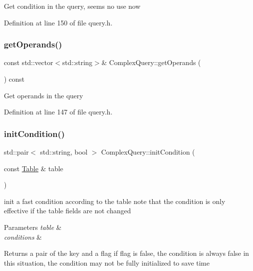 Get condition in the query, seems no use now 

Definition at line 150 of file query.\+h.

\mbox{\label{class_complex_query_a8b01ad18d858402ac96ab83e85e5198f}} 
\subsubsection{\texorpdfstring{get\+Operands()}{getOperands()}}
{\footnotesize\ttfamily const std\+::vector$<$std\+::string$>$\& Complex\+Query\+::get\+Operands (\begin{DoxyParamCaption}{ }\end{DoxyParamCaption}) const\hspace{0.3cm}{\ttfamily [inline]}}

Get operands in the query 

Definition at line 147 of file query.\+h.

\mbox{\label{class_complex_query_af4a16c28edc5ecc3631ef528349279af}} 
\subsubsection{\texorpdfstring{init\+Condition()}{initCondition()}}
{\footnotesize\ttfamily std\+::pair$<$ std\+::string, bool $>$ Complex\+Query\+::init\+Condition (\begin{DoxyParamCaption}\item[{const \hyperlink{class_table}{Table} \&}]{table }\end{DoxyParamCaption})}

init a fast condition according to the table note that the condition is only effective if the table fields are not changed 
\begin{DoxyParams}{Parameters}
{\em table} & \\
\hline
{\em conditions} & \\
\hline
\end{DoxyParams}
\begin{DoxyReturn}{Returns}
a pair of the key and a flag if flag is false, the condition is always false in this situation, the condition may not be fully initialized to save time 
\end{DoxyReturn}


